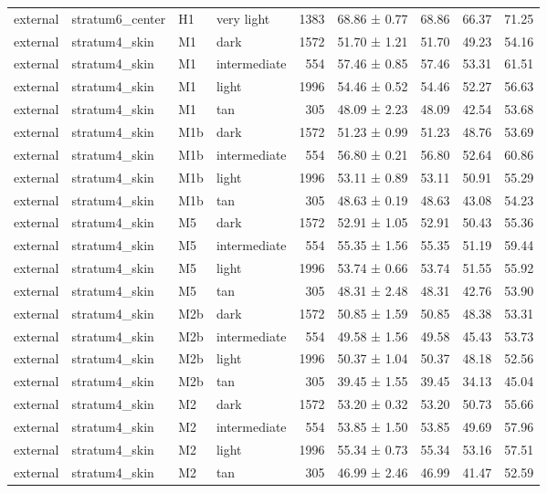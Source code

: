 \begin{tabular}{llllrlrrr}
external & stratum6\_center & H1 & very light & 1383 & 68.86 ± 0.77 & 68.86 & 66.37 & 71.25 \\
external & stratum4\_skin & M1 & dark & 1572 & 51.70 ± 1.21 & 51.70 & 49.23 & 54.16 \\
external & stratum4\_skin & M1 & intermediate & 554 & 57.46 ± 0.85 & 57.46 & 53.31 & 61.51 \\
external & stratum4\_skin & M1 & light & 1996 & 54.46 ± 0.52 & 54.46 & 52.27 & 56.63 \\
external & stratum4\_skin & M1 & tan & 305 & 48.09 ± 2.23 & 48.09 & 42.54 & 53.68 \\
external & stratum4\_skin & M1b & dark & 1572 & 51.23 ± 0.99 & 51.23 & 48.76 & 53.69 \\
external & stratum4\_skin & M1b & intermediate & 554 & 56.80 ± 0.21 & 56.80 & 52.64 & 60.86 \\
external & stratum4\_skin & M1b & light & 1996 & 53.11 ± 0.89 & 53.11 & 50.91 & 55.29 \\
external & stratum4\_skin & M1b & tan & 305 & 48.63 ± 0.19 & 48.63 & 43.08 & 54.23 \\
external & stratum4\_skin & M5 & dark & 1572 & 52.91 ± 1.05 & 52.91 & 50.43 & 55.36 \\
external & stratum4\_skin & M5 & intermediate & 554 & 55.35 ± 1.56 & 55.35 & 51.19 & 59.44 \\
external & stratum4\_skin & M5 & light & 1996 & 53.74 ± 0.66 & 53.74 & 51.55 & 55.92 \\
external & stratum4\_skin & M5 & tan & 305 & 48.31 ± 2.48 & 48.31 & 42.76 & 53.90 \\
external & stratum4\_skin & M2b & dark & 1572 & 50.85 ± 1.59 & 50.85 & 48.38 & 53.31 \\
external & stratum4\_skin & M2b & intermediate & 554 & 49.58 ± 1.56 & 49.58 & 45.43 & 53.73 \\
external & stratum4\_skin & M2b & light & 1996 & 50.37 ± 1.04 & 50.37 & 48.18 & 52.56 \\
external & stratum4\_skin & M2b & tan & 305 & 39.45 ± 1.55 & 39.45 & 34.13 & 45.04 \\
external & stratum4\_skin & M2 & dark & 1572 & 53.20 ± 0.32 & 53.20 & 50.73 & 55.66 \\
external & stratum4\_skin & M2 & intermediate & 554 & 53.85 ± 1.50 & 53.85 & 49.69 & 57.96 \\
external & stratum4\_skin & M2 & light & 1996 & 55.34 ± 0.73 & 55.34 & 53.16 & 57.51 \\
external & stratum4\_skin & M2 & tan & 305 & 46.99 ± 2.46 & 46.99 & 41.47 & 52.59 \\

\end{tabular}
